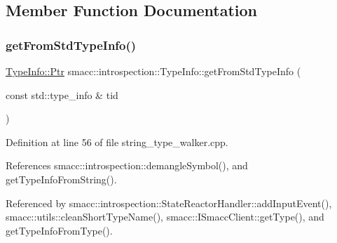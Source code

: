\subsection{Member Function Documentation}
\mbox{\label{classsmacc_1_1introspection_1_1TypeInfo_ada1e604cd8bf968a5f816fbace4af881}} 
\subsubsection{\texorpdfstring{get\+From\+Std\+Type\+Info()}{getFromStdTypeInfo()}}
{\footnotesize\ttfamily \hyperlink{classsmacc_1_1introspection_1_1TypeInfo_aa6ffd9c39811d59f7c771941b7fad860}{Type\+Info\+::\+Ptr} smacc\+::introspection\+::\+Type\+Info\+::get\+From\+Std\+Type\+Info (\begin{DoxyParamCaption}\item[{const std\+::type\+\_\+info \&}]{tid }\end{DoxyParamCaption})\hspace{0.3cm}{\ttfamily [static]}}



Definition at line 56 of file string\+\_\+type\+\_\+walker.\+cpp.



References smacc\+::introspection\+::demangle\+Symbol(), and get\+Type\+Info\+From\+String().



Referenced by smacc\+::introspection\+::\+State\+Reactor\+Handler\+::add\+Input\+Event(), smacc\+::utils\+::clean\+Short\+Type\+Name(), smacc\+::\+I\+Smacc\+Client\+::get\+Type(), and get\+Type\+Info\+From\+Type().



